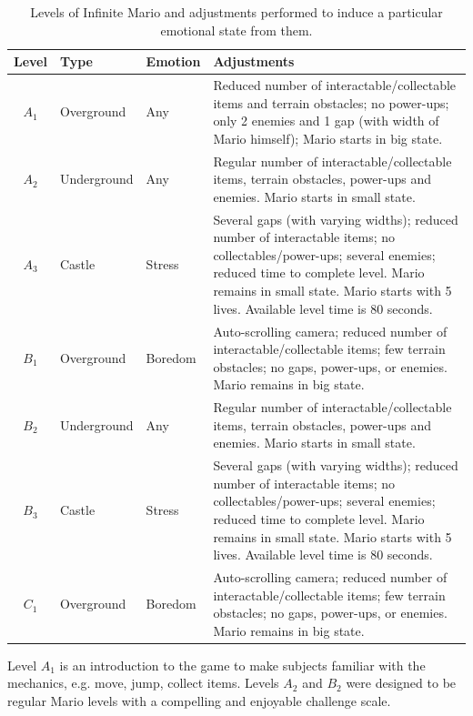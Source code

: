 \begin{landscape}
\begin{table}
    \centering
    \caption{Levels of Infinite Mario and adjustments performed to induce a particular emotional state from them.}
    \label{table:experiment2-mario-levels}
    \begin{tabular}[l]{@{}cllp{9.5cm}}
        \hline
            \textbf{Level} & \textbf{Type} & \textbf{Emotion} & \textbf{Adjustments} \\
        \hline
            $A_1$ & Overground  & Any & Reduced number of interactable/collectable items and terrain obstacles; no power-ups; only 2 enemies and 1 gap (with width of Mario himself); Mario starts in big state. \\
            $A_2$ & Underground & Any & Regular number of interactable/collectable items, terrain obstacles, power-ups and enemies. Mario starts in small state. \\
            $A_3$ & Castle      & Stress  & Several gaps (with varying widths); reduced number of interactable items; no collectables/power-ups; several enemies; reduced time to complete level. Mario remains in small state. Mario starts with 5 lives. Available level time is 80 seconds. \\
            $B_1$ & Overground  & Boredom & Auto-scrolling camera; reduced number of interactable/collectable items; few terrain obstacles; no gaps, power-ups, or enemies. Mario remains in big state. \\
            $B_2$ & Underground & Any & Regular number of interactable/collectable items, terrain obstacles, power-ups and enemies. Mario starts in small state. \\
            $B_3$ & Castle      & Stress  & Several gaps (with varying widths); reduced number of interactable items; no collectables/power-ups; several enemies; reduced time to complete level. Mario remains in small state. Mario starts with 5 lives. Available level time is 80 seconds. \\
            $C_1$ & Overground  & Boredom & Auto-scrolling camera; reduced number of interactable/collectable items; few terrain obstacles; no gaps, power-ups, or enemies. Mario remains in big state. \\
        \hline
    \end{tabular}
\end{table}
\end{landscape}

Level $A_1$ is an introduction to the game to make subjects familiar with the mechanics, e.g. move, jump, collect items. Levels $A_2$ and $B_2$ were designed to be regular Mario levels with a compelling and enjoyable challenge scale.


